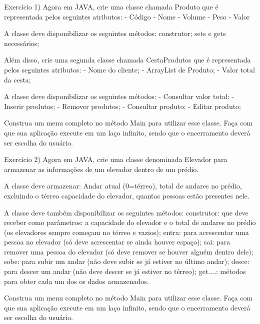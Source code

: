 Exercício 1) Agora em JAVA, crie uma classe chamada Produto que é representada pelos seguintes atributos:
- Código
- Nome
- Volume
- Peso
- Valor

A classe deve disponibilizar os seguintes métodos:
    construtor;
    sets e gets necessários;

Além disso, crie uma segunda classe chamada CestaProdutos que é representada pelos seguintes atributos:
- Nome do cliente;
- ArrayList de Produto;
- Valor total da cesta;

A classe deve disponibilizar os seguintes métodos:
- Consultar valor total;
- Inserir produtos;
- Remover produtos;
- Consultar produto;
- Editar produto;

Construa um menu completo no método Main para utilizar esse classe. Faça com que sua aplicação execute em um laço infinito, sendo que o encerramento deverá ser escolha do usuário.

Exercício 2) Agora em JAVA, crie uma classe denominada Elevador para armazenar as informações de um elevador dentro de um prédio.

A classe deve armazenar:
    Andar atual (0=térreo),
    total de andares no prédio, excluindo o térreo
    capacidade do elevador,
    quantas pessoas estão presentes nele.

A classe deve também disponibilizar os seguintes métodos:
    construtor: que deve receber como parâmetros: a capacidade do elevador e o total de andares no prédio
                     (os elevadores sempre começam no térreo e vazios);
    entra:       para acrescentar uma pessoa no elevador (só deve acrescentar se ainda houver espaço);
    sai:           para remover uma pessoa do elevador (só deve remover se houver alguém dentro dele);
    sobe:       para subir um andar (não deve subir se já estiver no último andar);
    desce:     para descer um andar (não deve descer se já estiver no térreo);
    get....:      métodos para obter cada um dos os dados armazenados.

Construa um menu completo no método Main para utilizar esse classe. Faça com que sua aplicação execute em um laço infinito, sendo que o encerramento deverá ser escolha do usuário.